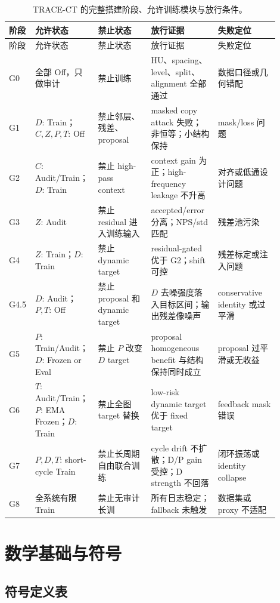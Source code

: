 \documentclass[11pt,a4paper,UTF8,fontset=fandol]{ctexart}
\theoremstyle{definition}
\begin{document}
\begin{longtable}{p{0.07\linewidth}p{0.18\linewidth}p{0.19\linewidth}p{0.24\linewidth}p{0.22\linewidth}}
\caption{TRACE-CT 的完整搭建阶段、允许训练模块与放行条件。}\label{tab:release-stages}\\
\toprule
阶段 & 允许状态 & 禁止状态 & 放行证据 & 失败定位 \\
\midrule
\endfirsthead
\toprule
阶段 & 允许状态 & 禁止状态 & 放行证据 & 失败定位 \\
\midrule
\endhead
G0 & 全部 Off，只做审计 & 禁止训练 & HU、spacing、level、split、alignment 全部通过 & 数据口径或几何错配 \\
G1 & $D$: Train；$C,Z,P,T$: Off & 禁止邻层、残差、proposal & masked copy attack 失败；非恒等；小结构保持 & mask/loss 问题 \\
G2 & $C$: Audit/Train；$D$: Train & 禁止 high-pass context & context gain 为正；high-frequency leakage 不升高 & 对齐或低通设计问题 \\
G3 & $Z$: Audit & 禁止 residual 进入训练输入 & accepted/error 分离；NPS/std 匹配 & 残差池污染 \\
G4 & $Z$: Train；$D$: Train & 禁止 dynamic target & residual-gated 优于 G2；shift 可控 & 残差标定或注入问题 \\
G4.5 & $D$: Audit；$P,T$: Off & 禁止 proposal 和 dynamic target & $D$ 去噪强度落入目标区间；输出残差像噪声 & conservative identity 或过平滑 \\
G5 & $P$: Train/Audit；$D$: Frozen or Eval & 禁止 $P$ 改变 $D$ target & proposal homogeneous benefit 与结构保持同时成立 & proposal 过平滑或无收益 \\
G6 & $T$: Audit/Train；$P$: EMA Frozen；$D$: Train & 禁止全图 target 替换 & low-risk dynamic target 优于 fixed target & feedback mask 错误 \\
G7 & $P,D,T$: short-cycle Train & 禁止长周期自由联合训练 & cycle drift 不扩散；D/P gain 受控；D strength 不回落 & 闭环振荡或 identity collapse \\
G8 & 全系统有限 Train & 禁止无审计长训 & 所有日志稳定；fallback 未触发 & 数据集或 proxy 不适配 \\
\bottomrule
\end{longtable}


\section{数学基础与符号}

\subsection{符号定义表}
\end{document}
